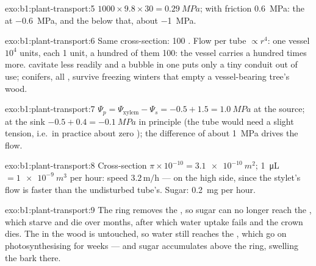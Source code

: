 \begin{solution}{exo:b1:plant-transport:5}
$1000\times 9.8\times 30 = \qty{0.29}{MPa}$; with friction
\qty{0.6}{MPa}: the  at \qty{-0.6}{MPa}, and the  below that,
about \qty{-1}{MPa}.
\end{solution}

\begin{solution}{exo:b1:plant-transport:6}
Same cross-section: 100 . Flow per tube $\propto r^4$: one
vessel $10^4$ units, each  1 unit, a hundred of them 100:
the vessel carries a hundred times more.  cavitate less
readily and a bubble in one puts only a tiny conduit out of use;
conifers, all , survive freezing winters that empty a
vessel-bearing tree's wood.
\end{solution}

\begin{solution}{exo:b1:plant-transport:7}
$\Psi_p = \Psi_{\text{xylem}} - \Psi_s = -0.5 + 1.5 = \qty{1.0}{MPa}$
at the source; at the sink $-0.5 + 0.4 = \qty{-0.1}{MPa}$ in principle
(the tube would need a slight tension, i.e.\ in practice about zero
); the difference of about \qty{1}{MPa} drives the flow.
\end{solution}

\begin{solution}{exo:b1:plant-transport:8}
Cross-section $\pi\times 10^{-10} = \qty{3.1e-10}{m^2}$; \qty{1}{\micro L}
$= \qty{1e-9}{m^3}$ per hour: speed $3.2\,\mathrm{m/h}$ --- on the
high side, since the stylet's flow is faster than the undisturbed
tube's. Sugar: \qty{0.2}{mg} per hour.
\end{solution}

\begin{solution}{exo:b1:plant-transport:9}
The ring removes the , so sugar can no longer reach the ,
which starve and die over months, after which water uptake fails and
the crown dies. The  in the wood is untouched, so water still
reaches the , which go on photosynthesising for weeks --- and
sugar accumulates above the ring, swelling the bark there.
\end{solution}

